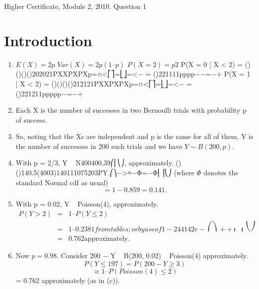 \documentclass[a4paper,12pt]{article}
\begin{document}
Higher Certificate, Module 2, 2010. Question 1

\section{Introduction}

\begin{enumerate}
    \item
$E(X) = 2p$ $Var(X) = 2p(1 – p)$ $P(X = 2) = p2$
P(X = 0 | X < 2) = ()()()()202021PXXPXPXp=∩<⎡⎤=⎣⎦=<− = ()221111pppp−−=−+
P(X = 1 | X < 2) = ()()()()212121PXXPXPXp=∩<⎡⎤=⎣⎦=<− = ()221211ppppp−=−+

\smallskip
[Alternatively, $P(X = 1 | X < 2)$ may be obtained as 1 − P(X = 0 | X < 2).]
    \item Each X is the number of successes in two Bernoulli trials with probability p of success. 
    \item So, noting that the Xs are independent and p is the same for all of them, Y is the number of successes in 200 such trials and we have $Y \sim B(200, p)$.
    \item With p = 2/3, Y ~ N400400,39⎛⎜⎝⎠, approximately.
()()140.5(4003)140111075203PY.⎛⎞−>≈−Φ=−Φ⎜⎟⎝⎠
(where $\Phi$ denotes the standard Normal cdf as usual)
\[= 1 − 0.859 = 0.141.\]
\item With p = 0.02, Y ~ Poisson(4), approximately.
\begin{eqnarray}
P(Y > 2) &=& 1 – P(Y \leq 2)\\
&=&  1 – 0.2381 from tables; or by use of 1−244142e−⎛⎞++⎜⎟⎝⎠\\
&=&  0.762 \mbox{approximately}.
\end{eqnarray}
    \item Now $p = 0.98$.
Consider 200 − Y ~ B(200, 0.02) ~ Poisson(4) approximately.
\[P(Y ≤ 197) = P(200 − Y ≥ 3)\]
\[≈ 1 – P(Poisson(4) ≤ 2)\] = 0.762 approximately (as in (c)).
\end{enumerate}
\end{document}
